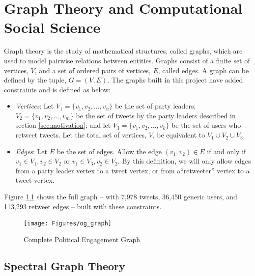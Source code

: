 \chapter{Graph Theory and Computational Social Science}\label{ch:GraphTheory}

Graph theory is the study of mathematical structures, called graphs, which are
used to model pairwise relations between entities. Graphs consist of a finite
set of vertices, $V$, and a set of ordered pairs of vertices, $E$, called edges.
A graph can be defined by the tuple, $G=(V,E)$. The graphs built in this project
have added constraints and is defined as below:

\begin{itemize}
    \item \emph{Vertices}: Let $V_{1}=\{v_{1},v_{2},...,v_{n}\}$ be the set of
    party leaders; $V_{2}=\{v_{1},v_{2},...,v_{m}\}$ be the set of tweets by the
    party leaders described in section \ref{sec:motivation}; and let
    $V_{3}=\{v_{1},v_{2},...,v_{k}\}$ be the set of users who retweet tweets.
    Let the total set of vertices, $V$, be equivalent to $V_{1}\cup V_{2}\cup
    V_{3}$.    
    \item \emph{Edges}: Let $E$ be the set of edges. Allow the edge $(v_{1},
    v_{2})\in E$ if and only if $v_{1}\in V_{1}, v_{2}\in V_{2}$ or $v_{1}\in
    V_{3}, v_{2}\in V_{2}$. By this definition, we will only allow edges from a
    party leader vertex to a tweet vertex, or from a“retweeter” vertex to a
    tweet vertex.
\end{itemize}

Figure \ref{fig:og_graph} shows the full graph -- with 7,978 tweets, 36,450
generic users, and 113,293 retweet edges --  built with these constraints.

\begin{singlespacing}
    \begin{figure}[H]
    \centering
    \texttt{[image: Figures/og\_graph]}
    \caption[Complete Political Engagement Graph]{Complete Political Engagement Graph}
    \label{fig:og_graph}
    \end{figure}
\end{singlespacing}

\section{Spectral Graph Theory}\label{sec:spectralGraphTheory}

